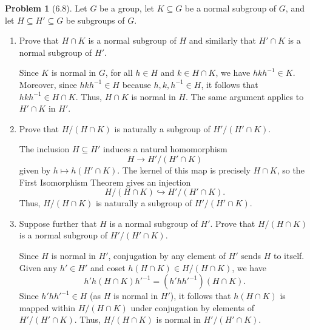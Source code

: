 \documentclass[12pt]{article}
\theoremstyle{definition}
\newtheorem{problem}{Problem}
\begin{document}
\begin{problem}[6.8]
    Let $G$ be a group, let $K \subseteq G$ be a normal subgroup of $G$, and let $H \subseteq H' \subseteq G$ be subgroups of $G$.
    \begin{enumerate}[label=(\alph*)]
        \item Prove that $H \cap K$ is a normal subgroup of $H$ and similarly that $H' \cap K$ is a normal subgroup of $H'$.
              
        \begin{solution}
            Since $K$ is normal in $G$, for all $h \in H$ and $k \in H \cap K$, we have $hkh^{-1} \in K$. 
            Moreover, since $hkh^{-1} \in H$ because $h, k, h^{-1} \in H$, it follows that $hkh^{-1} \in H \cap K$. 
            Thus, $H \cap K$ is normal in $H$. The same argument applies to $H' \cap K$ in $H'$. 
        \end{solution}

        \item Prove that $H/(H \cap K)$ is naturally a subgroup of $H'/(H' \cap K)$.
        
        \begin{solution}
            The inclusion $H \subseteq H'$ induces a natural homomorphism \[ H \to H'/(H' \cap K) \] given by $h \mapsto h(H' \cap K)$. 
            The kernel of this map is precisely $H \cap K$, so the First Isomorphism Theorem gives an injection \[ H/(H \cap K) \hookrightarrow H'/(H' \cap K). \] 
            Thus, $H/(H \cap K)$ is naturally a subgroup of $H'/(H' \cap K)$. 
        \end{solution}

        \item Suppose further that $H$ is a normal subgroup of $H'$. Prove that $H/(H \cap K)$ is a normal subgroup of $H'/(H' \cap K)$.
        
        \begin{solution}
            Since $H$ is normal in $H'$, conjugation by any element of $H'$ sends $H$ to itself. 
            Given any $h' \in H'$ and coset $h(H \cap K) \in H/(H \cap K)$, we have \[ h' h (H \cap K) h'^{-1} = (h' h h'^{-1}) (H \cap K). \]
            Since $h' h h'^{-1} \in H$ (as $H$ is normal in $H'$), it follows that $h(H \cap K)$ is mapped within $H/(H \cap K)$ under conjugation by elements of $H'/(H' \cap K)$. 
            Thus, $H/(H \cap K)$ is normal in $H'/(H' \cap K)$. 
        \end{solution}
    \end{enumerate}
\end{problem}
\end{document}
